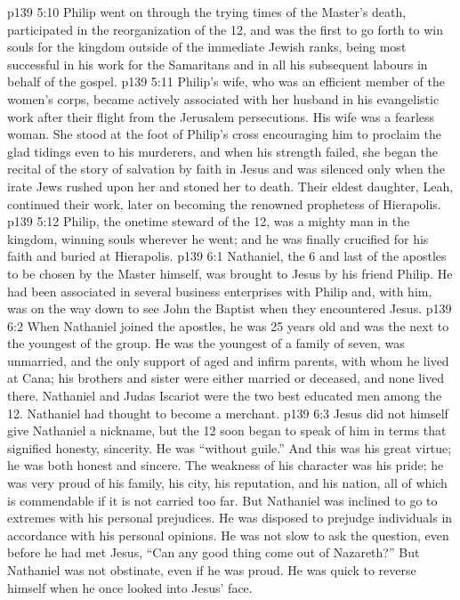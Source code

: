 \vs p139 5:10 Philip went on through the trying times of the Master’s death, participated in the reorganization of the 12, and was the first to go forth to win souls for the kingdom outside of the immediate Jewish ranks, being most successful in his work for the Samaritans and in all his subsequent labours in behalf of the gospel.
\vs p139 5:11 \pc Philip’s wife, who was an efficient member of the women’s corps, became actively associated with her husband in his evangelistic work after their flight from the Jerusalem persecutions. His wife was a fearless woman. She stood at the foot of Philip’s cross encouraging him to proclaim the glad tidings even to his murderers, and when his strength failed, she began the recital of the story of salvation by faith in Jesus and was silenced only when the irate Jews rushed upon her and stoned her to death. Their eldest daughter, Leah, continued their work, later on becoming the renowned prophetess of Hierapolis.
\vs p139 5:12 \pc Philip, the onetime steward of the 12, was a mighty man in the kingdom, winning souls wherever he went; and he was finally crucified for his faith and buried at Hierapolis.
\vs p139 6:1 Nathaniel, the 6 and last of the apostles to be chosen by the Master himself, was brought to Jesus by his friend Philip. He had been associated in several business enterprises with Philip and, with him, was on the way down to see John the Baptist when they encountered Jesus.
\vs p139 6:2 When Nathaniel joined the apostles, he was 25 years old and was the next to the youngest of the group. He was the youngest of a family of seven, was unmarried, and the only support of aged and infirm parents, with whom he lived at Cana; his brothers and sister were either married or deceased, and none lived there. Nathaniel and Judas Iscariot were the two best educated men among the 12. Nathaniel had thought to become a merchant.
\vs p139 6:3 \pc Jesus did not himself give Nathaniel a nickname, but the 12 soon began to speak of him in terms that signified honesty, sincerity. He was “without guile.” And this was his great virtue; he was both honest and sincere. The weakness of his character was his pride; he was very proud of his family, his city, his reputation, and his nation, all of which is commendable if it is not carried too far. But Nathaniel was inclined to go to extremes with his personal prejudices. He was disposed to prejudge individuals in accordance with his personal opinions. He was not slow to ask the question, even before he had met Jesus, “Can any good thing come out of Nazareth?” But Nathaniel was not obstinate, even if he was proud. He was quick to reverse himself when he once looked into Jesus’ face.
